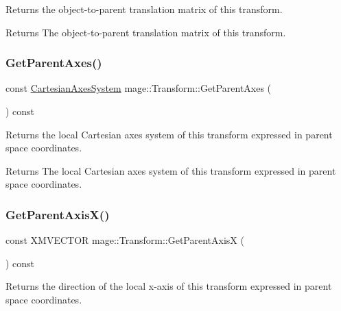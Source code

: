 Returns the object-\/to-\/parent translation matrix of this transform.

\begin{DoxyReturn}{Returns}
The object-\/to-\/parent translation matrix of this transform. 
\end{DoxyReturn}
\hypertarget{structmage_1_1_transform_aad9c46d73c7afd7412a65fe5381ae4b6}{}\label{structmage_1_1_transform_aad9c46d73c7afd7412a65fe5381ae4b6} 
\subsubsection{\texorpdfstring{Get\+Parent\+Axes()}{GetParentAxes()}}
{\footnotesize\ttfamily const \hyperlink{structmage_1_1_cartesian_axes_system}{Cartesian\+Axes\+System} mage\+::\+Transform\+::\+Get\+Parent\+Axes (\begin{DoxyParamCaption}{ }\end{DoxyParamCaption}) const\hspace{0.3cm}{\ttfamily [noexcept]}}

Returns the local Cartesian axes system of this transform expressed in parent space coordinates.

\begin{DoxyReturn}{Returns}
The local Cartesian axes system of this transform expressed in parent space coordinates. 
\end{DoxyReturn}
\hypertarget{structmage_1_1_transform_a552e7b9e654d57e6ba6281eaa6d25ca2}{}\label{structmage_1_1_transform_a552e7b9e654d57e6ba6281eaa6d25ca2} 
\subsubsection{\texorpdfstring{Get\+Parent\+Axis\+X()}{GetParentAxisX()}}
{\footnotesize\ttfamily const X\+M\+V\+E\+C\+T\+OR mage\+::\+Transform\+::\+Get\+Parent\+AxisX (\begin{DoxyParamCaption}{ }\end{DoxyParamCaption}) const\hspace{0.3cm}{\ttfamily [noexcept]}}

Returns the direction of the local x-\/axis of this transform expressed in parent space coordinates.

